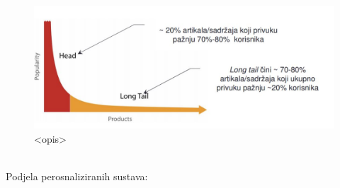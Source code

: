 \documentclass[a4paper,oneside,12pt]{memoir} %
\begin{document}
\begin{figure}[!h]
\begin{center}
\includegraphics[scale=0.6]{slike/long_tail.jpg}
\caption{<opis>}
\end{center}
\end{figure}
\bigskip
\\ Podjela perosnaliziranih sustava:
\end{document}
